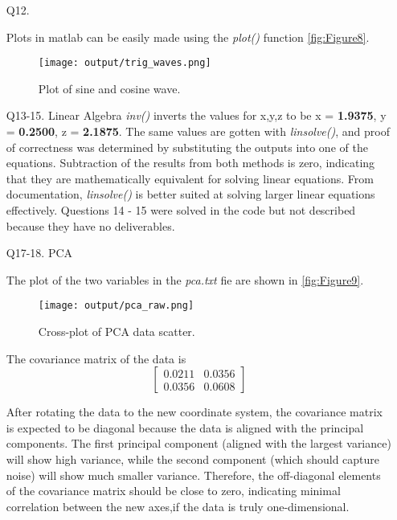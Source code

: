 \documentclass[12pt]{report}
\begin{document}
\begin{enumerate}
    \newpage
    \item[Q12.]

    Plots in matlab can be easily made using the \emph{plot()} function \autoref{fig:Figure8}.
    
    \begin{figure}[ht!]
        \texttt{[image: output/trig\_waves.png]}
        \centering
        \caption{Plot of sine and cosine wave.}
        \label{fig:Figure8}
    \end{figure}

    \item[Q13-15.] Linear Algebra
    \emph{inv()} inverts the values for x,y,z to be x = \textbf{1.9375}, y = \textbf{0.2500}, z = \textbf{2.1875}.
    The same values are gotten with \emph{linsolve()}, and proof of correctness was determined by substituting
    the outputs into one of the equations.  Subtraction of the results from both methods is zero, indicating that they
    are mathematically equivalent for solving linear equations. From documentation, \emph{linsolve()} is better 
    suited at solving larger linear equations effectively. Questions 14 - 15 were solved in the code but not 
    described because they have no deliverables.

    \item[Q17-18.] PCA

    The plot of the two variables in the \emph{pca.txt} fie are shown in \autoref{fig:Figure9}. 
    
    \begin{figure}[ht!]
        \texttt{[image: output/pca\_raw.png]}
        \centering
        \caption{Cross-plot of PCA data scatter.}
        \label{fig:Figure9}
    \end{figure}

    The covariance matrix of the data is 
    $$
    \begin{bmatrix}
    0.0211 & 0.0356 \\
    0.0356 & 0.0608
    \end{bmatrix}
    $$

    \newpage
    After rotating the data to the new coordinate system, the covariance matrix is expected to be 
    diagonal because the data is aligned with the principal components. The first principal component 
    (aligned with the largest variance) will show high variance, while the second component (which 
    should capture noise) will show much smaller variance. Therefore, the off-diagonal elements of the 
    covariance matrix should be close to zero, indicating minimal correlation between the new axes,if 
    the data is truly one-dimensional.


\end{enumerate}
\end{document}
